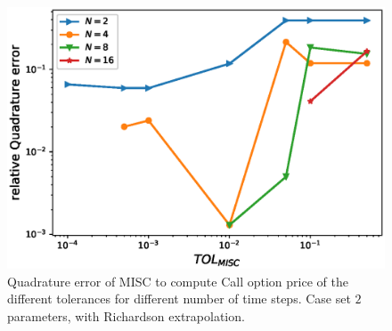 \documentclass[11pt]{article}
\begin{document}
\begin{figure}[h!]
	\centering
	\includegraphics[width=0.7\linewidth]{./figures/rBergomi_MISC_quadratre_error/vs_TOL/set2/relative_quad_error_wrt_MISC_TOL_set2_with_rich}
	
	
	\caption{Quadrature error of MISC to compute Call option price of the different tolerances for different number of time steps. Case  set $2$ parameters, with Richardson extrapolation.}
	\label{fig:Quadrature_error_set2_rich}
\end{figure}
\end{document}
